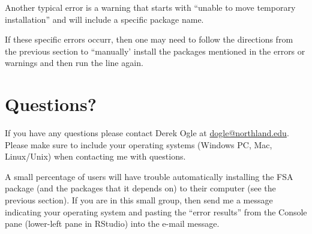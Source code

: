 \documentclass{article}\usepackage[]{graphicx}\usepackage[]{color}
\begin{document}
Another typical error is a warning that starts with ``unable to move temporary installation'' and will include a specific package name.

If these specific errors occurr, then one may need to follow the directions from the previous section to ``manually' install the packages mentioned in the errors or warnings and then run the  line again.

\section{Questions?}
If you have any questions please contact Derek Ogle at \href{mailto:dogle@northland.edu}{dogle@northland.edu}.  Please make sure to include your operating systems (Windows PC, Mac, Linux/Unix) when contacting me with questions.

A small percentage of users will have trouble automatically installing the FSA package (and the packages that it depends on) to their computer (see the previous section).  If you are in this small group, then send me a message indicating your operating system and pasting the ``error results'' from the Console pane (lower-left pane in RStudio) into the e-mail message.
\end{document}
